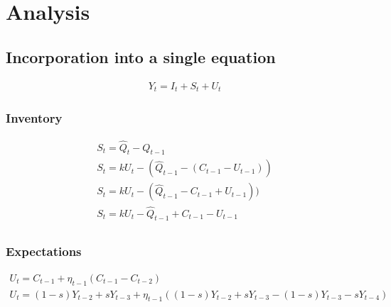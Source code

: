 \documentclass[]{article}
\begin{document}
\section*{Analysis}
\subsection*{Incorporation into a single equation}
\begin{gather*}
	Y_t=I_t+S_t+U_t
\end{gather*}
\subsubsection*{Inventory}

\begin{gather*}
	S_t=\hat Q_t-Q_{t-1}\\
	S_t=kU_t-(\hat Q_{t-1}-(C_{t-1}-U_{t-1}))\\
	S_t=kU_t-(\hat Q_{t-1}-C_{t-1}+U_{t-1}))\\
	S_t=kU_t-\hat Q_{t-1}+C_{t-1}-U_{t-1}\\
\end{gather*}
\subsubsection*{Expectations}
\begin{gather*}
	U_t = C_{t-1}+\eta_{t-1}(C_{t-1}-C_{t-2})\\
	U_t = (1-s)Y_{t-2}+sY_{t-3}+\eta_{t-1}((1-s)Y_{t-2}+sY_{t-3}-(1-s)Y_{t-3}-sY_{t-4})
\end{gather*}
\end{document}
